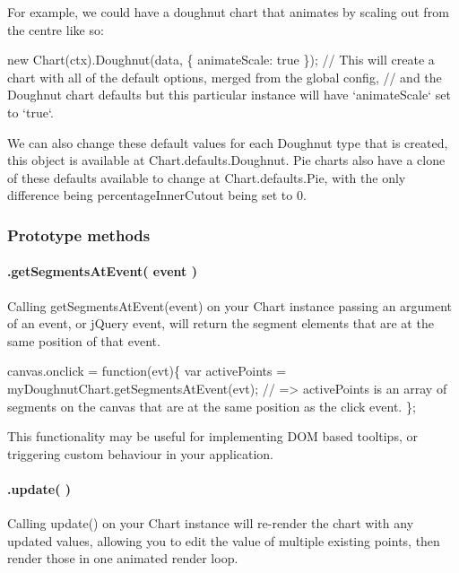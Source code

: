 For example, we could have a doughnut chart that animates by scaling out from the centre like so\+:


\begin{DoxyCode}
new Chart(ctx).Doughnut(data, \{
    animateScale: true
\});
// This will create a chart with all of the default options, merged from the global config,
// and the Doughnut chart defaults but this particular instance will have `animateScale` set to `true`.
\end{DoxyCode}


We can also change these default values for each Doughnut type that is created, this object is available at {\ttfamily Chart.\+defaults.\+Doughnut}. Pie charts also have a clone of these defaults available to change at {\ttfamily Chart.\+defaults.\+Pie}, with the only difference being {\ttfamily percentage\+Inner\+Cutout} being set to 0.

\subsubsection*{Prototype methods}

\paragraph*{.get\+Segments\+At\+Event( event )}

Calling {\ttfamily get\+Segments\+At\+Event(event)} on your Chart instance passing an argument of an event, or j\+Query event, will return the segment elements that are at the same position of that event.


\begin{DoxyCode}
canvas.onclick = function(evt)\{
    var activePoints = myDoughnutChart.getSegmentsAtEvent(evt);
    // => activePoints is an array of segments on the canvas that are at the same position as the click
       event.
\};
\end{DoxyCode}


This functionality may be useful for implementing D\+OM based tooltips, or triggering custom behaviour in your application.

\paragraph*{.update( )}

Calling {\ttfamily update()} on your Chart instance will re-\/render the chart with any updated values, allowing you to edit the value of multiple existing points, then render those in one animated render loop.


